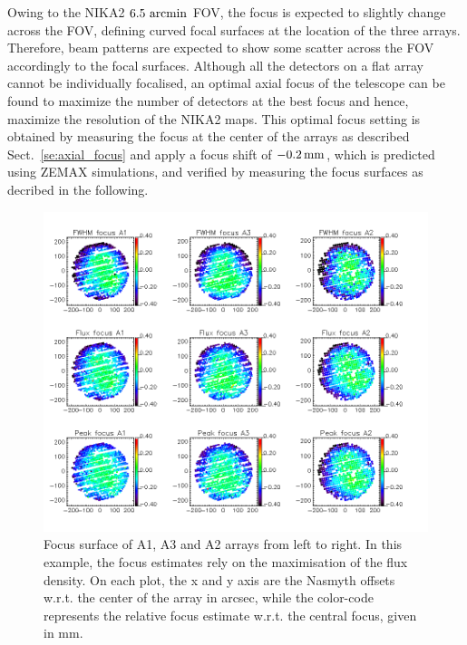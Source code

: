 
Owing to the NIKA2 $6.5~\rm{arcmin}$ FOV, the focus is expected to
slightly change across the FOV, defining curved focal surfaces at the
location of the three arrays. Therefore, beam patterns are expected to
show some scatter across the FOV accordingly to the focal
surfaces. Although all the detectors on a flat array cannot be
individually focalised, an optimal axial focus of the telescope can be
found to maximize the number of detectors at the best focus and hence,
maximize the resolution of the NIKA2 maps.
This optimal focus setting is obtained by measuring the focus at the
center of the arrays as described Sect.~\ref{se:axial_focus} and apply
a focus shift of $-0.2\,\rm{mm}$, which is 
predicted using ZEMAX simulations, and verified by measuring
the focus surfaces as decribed in the following.

\begin{figure}[!thbp]
\begin{center}
  \includegraphics[trim={0, 9.5cm, 0, 9.5cm}, clip=true, width=\linewidth]{Figures/fov_focus_mv_5.png}
\caption[Focus surfaces]{Focus surface of A1, A3 and A2 arrays from left to
  right. In this example, the focus estimates rely on the maximisation of the flux
  density. On each plot, the x and y axis are the Nasmyth offsets
  w.r.t. the center of the array in arcsec, while the color-code represents
  the relative focus estimate w.r.t. the central focus, given in mm.}
\label{fig:focus-surfaces}
\end{center}
\end{figure}

